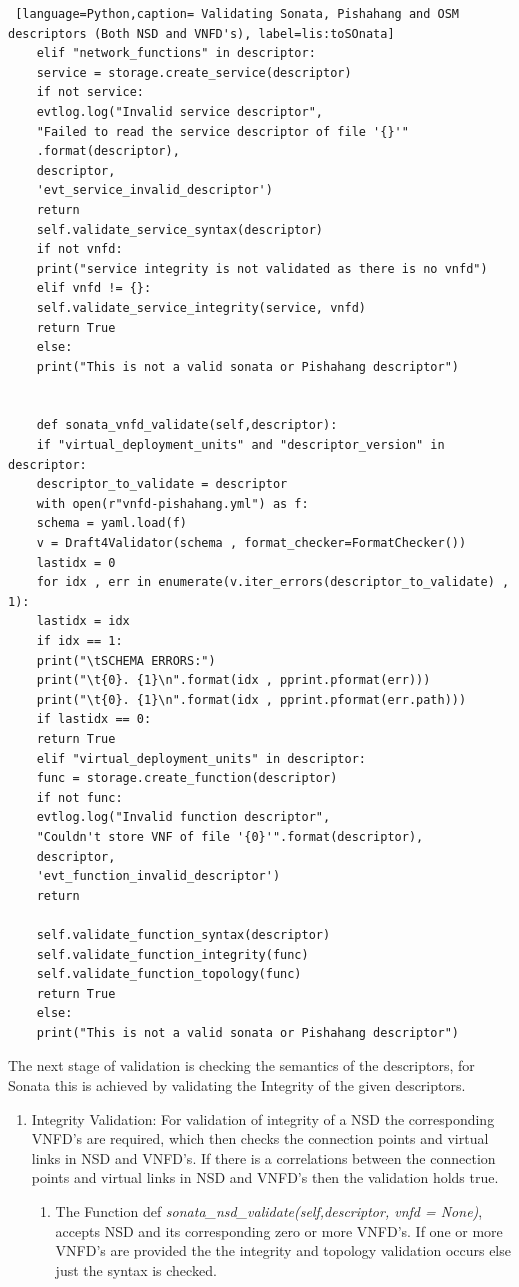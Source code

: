 \begin{lstlisting} [language=Python,caption= Validating Sonata, Pishahang and OSM descriptors (Both NSD and VNFD's), label=lis:toSOnata]
	elif "network_functions" in descriptor:
	service = storage.create_service(descriptor)
	if not service:
	evtlog.log("Invalid service descriptor",
	"Failed to read the service descriptor of file '{}'"
	.format(descriptor),
	descriptor,
	'evt_service_invalid_descriptor')
	return
	self.validate_service_syntax(descriptor)
	if not vnfd:
	print("service integrity is not validated as there is no vnfd")
	elif vnfd != {}:
	self.validate_service_integrity(service, vnfd)
	return True
	else:
	print("This is not a valid sonata or Pishahang descriptor")
	
	
	def sonata_vnfd_validate(self,descriptor):
	if "virtual_deployment_units" and "descriptor_version" in descriptor:
	descriptor_to_validate = descriptor
	with open(r"vnfd-pishahang.yml") as f:
	schema = yaml.load(f)
	v = Draft4Validator(schema , format_checker=FormatChecker())
	lastidx = 0
	for idx , err in enumerate(v.iter_errors(descriptor_to_validate) , 1):
	lastidx = idx
	if idx == 1:
	print("\tSCHEMA ERRORS:")
	print("\t{0}. {1}\n".format(idx , pprint.pformat(err)))
	print("\t{0}. {1}\n".format(idx , pprint.pformat(err.path)))
	if lastidx == 0:
	return True
	elif "virtual_deployment_units" in descriptor:
	func = storage.create_function(descriptor)
	if not func:
	evtlog.log("Invalid function descriptor",
	"Couldn't store VNF of file '{0}'".format(descriptor),
	descriptor,
	'evt_function_invalid_descriptor')
	return
	
	self.validate_function_syntax(descriptor)
	self.validate_function_integrity(func)
	self.validate_function_topology(func)
	return True
	else:
	print("This is not a valid sonata or Pishahang descriptor")
\end{lstlisting} 

 The next stage of validation is checking the semantics of the descriptors, for Sonata this is achieved by validating the Integrity of the given descriptors.
 \begin{enumerate}
 	\item Integrity Validation: For validation of integrity of a NSD the corresponding VNFD's are required, which then checks the connection points and virtual links in NSD and VNFD's. If there is a correlations between the connection points and virtual links in NSD and VNFD's then the validation holds true.
 	
 	\begin{enumerate}
 		\item The Function def \textit{sonata_nsd_validate(self,descriptor, vnfd = None)}, accepts NSD and its corresponding zero or more VNFD's. If one or more VNFD's are provided the the integrity and topology validation occurs else just the syntax is checked.  
 	\end{enumerate}
 	   
 \end{enumerate}
 
